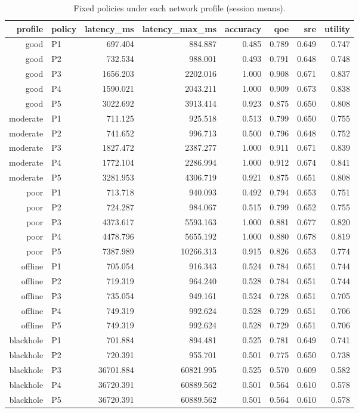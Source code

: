 \begin{table}[htbp]
\centering
\small
\caption{Fixed policies under each network profile (session means).}
\label{tab:static_profiles}
\begin{tabular}{r l r r r r r r}
\toprule
profile & policy & latency\_ms & latency\_max\_ms & accuracy & qoe & sre & utility \\
\midrule
good & P1 & 697.404 & 884.887 & 0.485 & 0.789 & 0.649 & 0.747 \\
good & P2 & 732.534 & 988.001 & 0.493 & 0.791 & 0.648 & 0.748 \\
good & P3 & 1656.203 & 2202.016 & 1.000 & 0.908 & 0.671 & 0.837 \\
good & P4 & 1590.021 & 2043.211 & 1.000 & 0.909 & 0.673 & 0.838 \\
good & P5 & 3022.692 & 3913.414 & 0.923 & 0.875 & 0.650 & 0.808 \\
moderate & P1 & 711.125 & 925.518 & 0.513 & 0.799 & 0.650 & 0.755 \\
moderate & P2 & 741.652 & 996.713 & 0.500 & 0.796 & 0.648 & 0.752 \\
moderate & P3 & 1827.472 & 2387.277 & 1.000 & 0.911 & 0.671 & 0.839 \\
moderate & P4 & 1772.104 & 2286.994 & 1.000 & 0.912 & 0.674 & 0.841 \\
moderate & P5 & 3281.953 & 4306.719 & 0.921 & 0.875 & 0.651 & 0.808 \\
poor & P1 & 713.718 & 940.093 & 0.492 & 0.794 & 0.653 & 0.751 \\
poor & P2 & 724.287 & 984.067 & 0.515 & 0.799 & 0.652 & 0.755 \\
poor & P3 & 4373.617 & 5593.163 & 1.000 & 0.881 & 0.677 & 0.820 \\
poor & P4 & 4478.796 & 5655.192 & 1.000 & 0.880 & 0.678 & 0.819 \\
poor & P5 & 7387.989 & 10266.313 & 0.915 & 0.826 & 0.653 & 0.774 \\
offline & P1 & 705.054 & 916.343 & 0.524 & 0.784 & 0.651 & 0.744 \\
offline & P2 & 719.319 & 964.240 & 0.528 & 0.784 & 0.651 & 0.744 \\
offline & P3 & 735.054 & 949.161 & 0.524 & 0.728 & 0.651 & 0.705 \\
offline & P4 & 749.319 & 992.624 & 0.528 & 0.729 & 0.651 & 0.706 \\
offline & P5 & 749.319 & 992.624 & 0.528 & 0.729 & 0.651 & 0.706 \\
blackhole & P1 & 701.884 & 894.481 & 0.525 & 0.781 & 0.649 & 0.741 \\
blackhole & P2 & 720.391 & 955.701 & 0.501 & 0.775 & 0.650 & 0.738 \\
blackhole & P3 & 36701.884 & 60821.995 & 0.525 & 0.570 & 0.609 & 0.582 \\
blackhole & P4 & 36720.391 & 60889.562 & 0.501 & 0.564 & 0.610 & 0.578 \\
blackhole & P5 & 36720.391 & 60889.562 & 0.501 & 0.564 & 0.610 & 0.578 \\
\bottomrule
\end{tabular}
\end{table}
